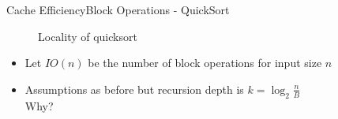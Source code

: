 
\begin{frame}{Cache Efficiency}{Block Operations - QuickSort}
  \begin{figure}%
    \begin{adjustbox}{width=\linewidth}%
    \end{adjustbox}%
    \caption{Locality of quicksort}
    \label{fig:caching:memory_locality_quicksort}
  \end{figure}%
  \begin{itemize}
    \item<2->
      Let {\color{Mittel-Blau}$IO(n)$} be the number of
      {\color{Mittel-Blau}block operations} for input size {\color{Mittel-Blau}$n$}
    \item<3->
      Assumptions as before but recursion depth is {\color{Mittel-Blau}$k = \log_2 \frac{n}{B}$}\\
      {\color{cyan}Why?}
  \end{itemize}
\end{frame}


